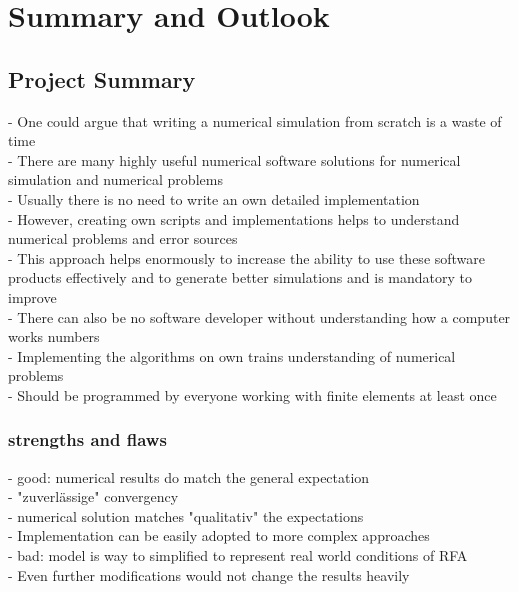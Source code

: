 \documentclass[parskip=half, titlepage=yes, 12pt, BCOR=12mm, DIV=calc]{scrartcl}
\begin{document}

\section{Summary and Outlook}

\subsection{Project Summary}
- One could argue that writing a numerical simulation from scratch is a waste of time \\
- There are many highly useful numerical software solutions for numerical simulation and numerical problems \\
- Usually there is no need to write an own detailed implementation \\
- However, creating own scripts and implementations helps to understand numerical problems and error sources \\
- This approach helps enormously to increase the ability to use these software products effectively and to generate better simulations and is mandatory to improve \\
- There can also be no software developer without understanding how a computer works numbers \\
- Implementing the algorithms on own trains understanding of numerical problems \\
- Should be programmed by everyone working with finite elements at least once \\

\subsubsection{strengths and flaws}
- good: numerical results do match the general expectation \\
- "zuverlässige" convergency \\
- numerical solution matches "qualitativ" the expectations \\
- Implementation can be easily adopted to more complex approaches \\

- bad: model is way to simplified to represent real world conditions of RFA \\
- Even further modifications would not change the results heavily \\
\end{document}
